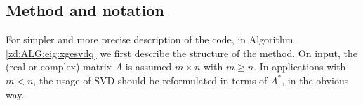 \documentclass[12pt, a4paper, final]{article}
\numberwithin{equation}{section}
\begin{document}
\subsection{Method and notation}
For simpler and more precise description of the code, in  Algorithm \ref{zd:ALG:eig:xgesvdq} we first describe the structure of the method.
On input, the (real or complex) matrix $A$ is assumed $m\times n$ with 
$m\geq n$. In applications with $m<n$, the usage of SVD should be
reformulated in terms of $A^*$, in the obvious way. 
\end{document}
